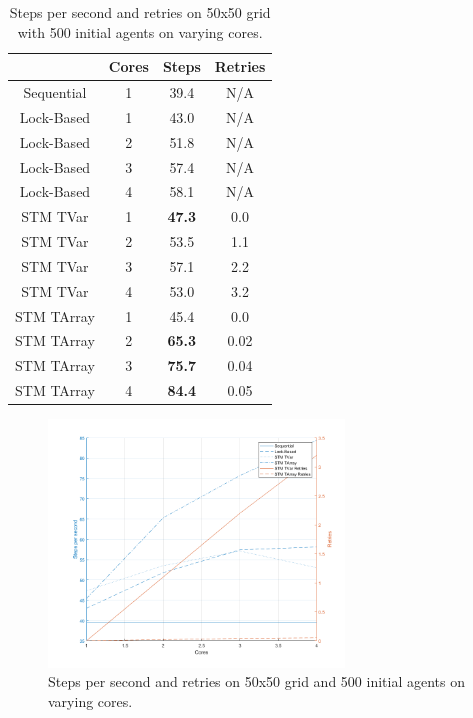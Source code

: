\begin{table}
	\centering
  	\begin{tabular}{ c || c | c | c }
                   & Cores & Steps & Retries  \\ \hline \hline 
    	Sequential & 1     & 39.4  & N/A      \\ \hline \hline   

    	Lock-Based & 1     & 43.0  & N/A       \\ \hline
    	Lock-Based & 2     & 51.8  & N/A       \\ \hline
    	Lock-Based & 3     & 57.4  & N/A       \\ \hline
    	Lock-Based & 4     & 58.1  & N/A       \\ \hline \hline   
   		
   		STM TVar   & 1     & \textbf{47.3}  & 0.0       \\ \hline
   		STM TVar   & 2     & 53.5  & 1.1       \\ \hline
   		STM TVar   & 3     & 57.1  & 2.2 	   \\ \hline
   		STM TVar   & 4     & 53.0  & 3.2	   \\ \hline \hline   
   		
   		STM TArray & 1     & 45.4  & 0.0 	   \\ \hline
   		STM TArray & 2     & \textbf{65.3}  & 0.02      \\ \hline
   		STM TArray & 3     & \textbf{75.7}  & 0.04      \\ \hline
   		STM TArray & 4     & \textbf{84.4}  & 0.05	   \\ \hline \hline   
   	\end{tabular}
  	
  	\caption{Steps per second and retries on 50x50 grid with 500 initial agents on varying cores.}
	\label{tab:varying_cores}
\end{table}

\begin{figure}
	\centering
	\includegraphics[width=0.7\textwidth, angle=0]{./fig/sugarscape/varying_cores.png}
	\caption{Steps per second and retries on 50x50 grid and 500 initial agents on varying cores.}
	\label{fig:varying_cores}
\end{figure}

